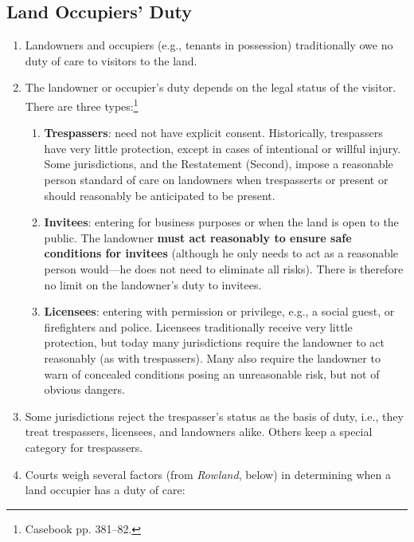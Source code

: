 \subsection{Land Occupiers' Duty}

\begin{enumerate}
    \item Landowners and occupiers (e.g., tenants in possession) 
    traditionally owe no duty of care to visitors to the land. 
    \item The landowner or occupier's duty depends on the legal status of the visitor. 
    There are three types:\footnote{Casebook pp. 381--82.}
    \begin{enumerate}
        \item \textbf{Trespassers}: need not have explicit consent. 
        Historically, trespassers have very little protection, except in cases 
        of intentional or willful injury. Some jurisdictions, and the 
        Restatement (Second), impose a reasonable person standard of care on 
        landowners when trespasserts or present or should reasonably be 
        anticipated to be present.
        \item \textbf{Invitees}: entering for business purposes or when the 
        land is open to the public. The landowner \textbf{must act reasonably to 
        ensure safe conditions for invitees} (although he only needs to act as 
        a reasonable person would---he does not need to eliminate all risks).  
        There is therefore no limit on the landowner's duty to 
        invitees.
        \item \textbf{Licensees}: entering with permission or privilege, e.g., 
        a social guest, or firefighters and police. Licensees traditionally 
        receive very little protection, but today many jurisdictions require 
        the landowner to act reasonably (as with trespassers). Many also 
        require the landowner to warn of concealed conditions posing an 
        unreasonable risk, but not of obvious dangers.
    \end{enumerate}
    \item Some jurisdictions reject the trespasser's status as the basis of 
    duty, i.e., they treat trespassers, licensees, and landowners alike. 
    Others keep a special category for trespassers.
    \item Courts weigh several factors (from \emph{Rowland}, below) in 
    determining when a land occupier has a duty of care:
    \begin{enumerate}

\end{enumerate}
\end{enumerate}
